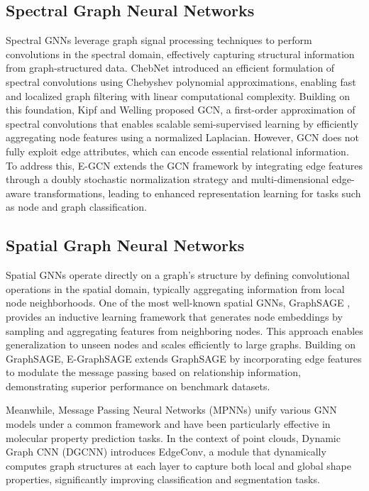 \documentclass[journal]{IEEEtran}
\begin{document}
\subsection{Spectral Graph Neural Networks}


Spectral GNNs leverage graph signal processing techniques to perform convolutions in the spectral domain, effectively capturing structural information from graph-structured data. ChebNet \cite{defferrard2016convolutional} introduced an efficient formulation of spectral convolutions using Chebyshev polynomial approximations, enabling fast and localized graph filtering with linear computational complexity. Building on this foundation, Kipf and Welling \cite{kipf2016semi} proposed GCN, a first-order approximation of spectral convolutions that enables scalable semi-supervised learning by efficiently aggregating node features using a normalized Laplacian. However, GCN does not fully exploit edge attributes, which can encode essential relational information. To address this, E-GCN \cite{gong2019exploiting} extends the GCN framework by integrating edge features through a doubly stochastic normalization strategy and multi-dimensional edge-aware transformations, leading to enhanced representation learning for tasks such as node and graph classification.

\subsection{Spatial Graph Neural Networks}

Spatial GNNs operate directly on a graph’s structure by defining convolutional operations in the spatial domain, typically aggregating information from local node neighborhoods. One of the most well-known spatial GNNs, GraphSAGE \cite{hamilton2017inductive}, provides an inductive learning framework that generates node embeddings by sampling and aggregating features from neighboring nodes. This approach enables generalization to unseen nodes and scales efficiently to large graphs. Building on GraphSAGE, E-GraphSAGE \cite{lo2022graphsage} extends GraphSAGE by incorporating edge features to modulate the message passing based on relationship information, demonstrating superior performance on benchmark datasets.

Meanwhile, Message Passing Neural Networks (MPNNs) \cite{gilmer2017neural} unify various GNN models under a common framework and have been particularly effective in molecular property prediction tasks. In the context of point clouds, Dynamic Graph CNN (DGCNN) \cite{wang2019dynamic} introduces EdgeConv, a module that dynamically computes graph structures at each layer to capture both local and global shape properties, significantly improving classification and segmentation tasks.  
\end{document}
